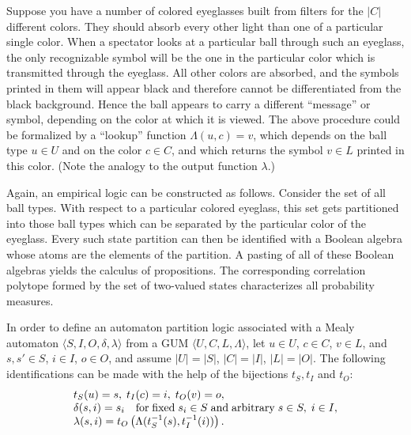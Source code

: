 Suppose you have a number of colored eyeglasses built from filters for the
$\vert C\vert $ different colors.
They should  absorb every other light than one of a particular single color.
When a spectator looks at a particular ball through such an eyeglass,
the only recognizable symbol will be the one in the particular
color which is transmitted through the eyeglass.
All other colors are absorbed, and the symbols printed in them will appear black
and therefore cannot be differentiated from the black background.
Hence the ball appears to carry a different ``message'' or symbol,
depending on the color at which it is viewed.
The above procedure could be formalized by a  ``lookup'' function $\Lambda (u,c)=v$,
which depends on the ball type $u\in U$ and on the color
$c\in C$, and which returns the symbol
$v\in L$ printed in this color.
(Note the analogy to the output function $\lambda$.)


Again, an empirical logic can be constructed as follows.
Consider the set of all ball types.
With respect to a particular colored eyeglass, this set
gets partitioned into those ball types which can be separated by the particular color of
the eyeglass.
Every such state partition can then be identified with a Boolean algebra whose atoms are the elements of the partition.
A pasting of all of these Boolean algebras yields the calculus of propositions.
The corresponding correlation polytope formed by the set of two-valued states
characterizes all probability measures.


In order to define an automaton partition logic associated with a Mealy automaton
$\langle S,I,O,\delta ,\lambda \rangle$
from a GUM $\langle U,C,L,\Lambda \rangle $,
let
$u\in U$,
$c\in C$,
$v\in L$,
and
$s,s'\in S$,
$i\in I$,
$o\in O$, and assume
$\vert U\vert =\vert S\vert$,
$\vert C\vert =\vert I\vert$,
$\vert L\vert =\vert O\vert$.
The following identifications can be made
with the help of  the bijections $t_S,t_I$ and $t_O$:
\begin{equation}
\begin{array}{llllll}
t_S(u)=s, \;
 t_I(c)=i, \;
 t_O(v)=o, \\
\delta (s,i)= s_i  \quad {\rm for \; fixed\;}s_i\in S {\rm \;and \;
arbitrary\;}s\in S,\; i\in I,\\
\lambda  (s,i) = t_O\left(\Lambda (t_S^{-1}(s),t_I^{-1}(i))\right).
\end{array}
\label{oto-ua}
\end{equation}

